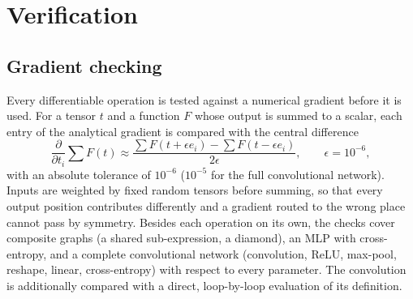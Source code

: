 \section{Verification}
\label{sec:verification}

\subsection{Gradient checking}
Every differentiable operation is tested against a numerical gradient before it is used. For a
tensor $t$ and a function $F$ whose output is summed to a scalar, each entry of the analytical
gradient is compared with the central difference
\begin{equation}
  \frac{\partial}{\partial t_i}\sum F(t) \approx \frac{\sum F(t + \epsilon e_i) - \sum F(t - \epsilon e_i)}{2\epsilon},
  \qquad \epsilon = 10^{-6},
\end{equation}
with an absolute tolerance of $10^{-6}$ ($10^{-5}$ for the full convolutional network). Inputs are
weighted by fixed random tensors before summing, so that every output position contributes
differently and a gradient routed to the wrong place cannot pass by symmetry. Besides each operation
on its own, the checks cover composite graphs (a shared sub-expression, a diamond), an MLP with
cross-entropy, and a complete convolutional network (convolution, ReLU, max-pool, reshape, linear,
cross-entropy) with respect to every parameter. The convolution is additionally compared with a
direct, loop-by-loop evaluation of its definition.

